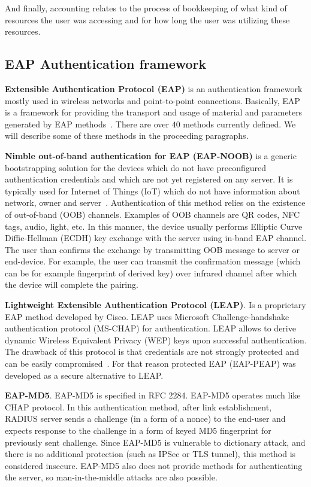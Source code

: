 And finally, accounting relates to the process of bookkeeping of what kind of resources the user was accessing and for how long the user was utilizing these resources.

\subsection{EAP Authentication framework}

\textbf{Extensible Authentication Protocol (EAP)} is an authentication framework mostly used in 
wireless networks and point-to-point connections. Basically, EAP is a framework for providing the 
transport and usage of material and parameters generated by EAP methods~\cite{wiki:EAP}.  There are over $40$
methods currently defined. We will describe some of these methods in the proceeding paragraphs.

\textbf{Nimble out-of-band authentication for EAP (EAP-NOOB)} is a generic bootstrapping solution for the devices which do not have preconfigured authentication credentials and which are not yet registered on any server. It is typically used for Internet of Things (IoT) which do not have information about network, owner and server~\cite{wiki:eapnoob}. Authentication of this method relies on the existence of out-of-band (OOB) channels. Examples of OOB channels are QR codes, NFC tags, audio, light, etc. In this manner, the device usually performs Elliptic Curve Diffie-Hellman (ECDH) key exchange with the server using in-band EAP channel. The user than confirms the exchange by transmitting OOB message to server or end-device. For example, the user can transmit the confirmation message (which can be for example fingerprint of derived key) over infrared channel after which the device will complete the pairing.

\textbf{Lightweight Extensible Authentication Protocol (LEAP)}. Is a proprietary EAP method developed by Cisco. LEAP uses Microsoft Challenge-handshake authentication protocol (MS-CHAP) for authentication. LEAP allows to derive dynamic Wireless Equivalent Privacy (WEP) keys upon successful authentication. The drawback of this protocol is that credentials are not strongly protected and can be easily compromised~\cite{}. For that reason protected EAP (EAP-PEAP) was developed as a secure alternative to LEAP.

\textbf{EAP-MD5}. EAP-MD5 is specified in RFC 2284. EAP-MD5 operates much like CHAP protocol. In this authentication method, after link establishment, RADIUS server sends a challenge (in a form of a nonce) to the end-user and expects response to the challenge in a form of keyed MD5 fingerprint for previously sent challenge. Since EAP-MD5 is vulnerable to dictionary attack, and there is no additional protection (such as IPSec or TLS tunnel), this method is considered insecure. EAP-MD5 also does not provide methods for authenticating the server, so man-in-the-middle attacks are also possible.


